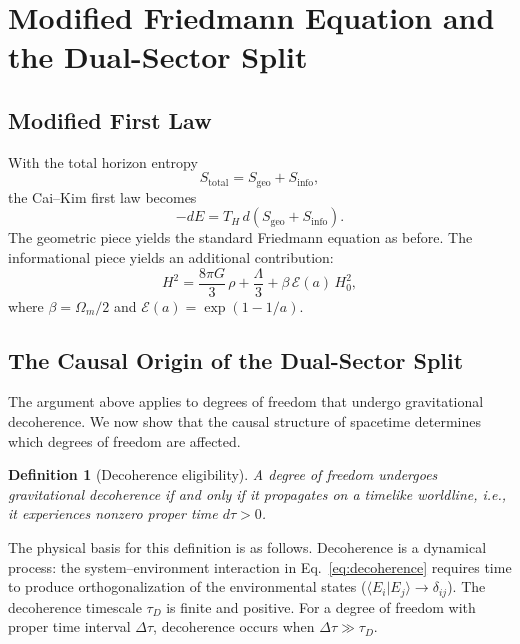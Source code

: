 \documentclass[11pt]{article}
\newtheorem{definition}{Definition}
\begin{document}
\section{Modified Friedmann Equation and the Dual-Sector Split}
\label{sec:dual_sector}

\subsection{Modified First Law}

With the total horizon entropy
\begin{equation}
S_\mathrm{total} = S_\mathrm{geo} + S_\mathrm{info},
\label{eq:stotal}
\end{equation}
the Cai--Kim first law becomes
\begin{equation}
-dE = T_H\,d(S_\mathrm{geo} + S_\mathrm{info}).
\label{eq:modified_first_law}
\end{equation}
The geometric piece yields the standard Friedmann equation as before.  The
informational piece yields an additional contribution:
\begin{equation}
H^2 = \frac{8\pi G}{3}\,\rho + \frac{\Lambda}{3}
  + \beta\,\mathcal{E}(a)\,H_0^2,
\label{eq:modified_friedmann}
\end{equation}
where $\beta = \Omega_m/2$ and $\mathcal{E}(a) = \exp(1 - 1/a)$.

\subsection{The Causal Origin of the Dual-Sector Split}
\label{sec:causal_split}

The argument above applies to degrees of freedom that undergo gravitational
decoherence.  We now show that the causal structure of spacetime determines
which degrees of freedom are affected.

\begin{definition}[Decoherence eligibility]
\label{def:eligibility}
A degree of freedom undergoes gravitational decoherence if and only if it
propagates on a timelike worldline, i.e., it experiences nonzero proper time
$d\tau > 0$.
\end{definition}

The physical basis for this definition is as follows.  Decoherence is a
dynamical process: the system--environment interaction in
Eq.~\eqref{eq:decoherence} requires time to produce orthogonalization of the
environmental states ($\langle E_i | E_j \rangle \to \delta_{ij}$).  The
decoherence timescale $\tau_D$ is finite and positive.  For a degree of freedom
with proper time interval $\Delta\tau$, decoherence occurs when
$\Delta\tau \gg \tau_D$.
\end{document}
